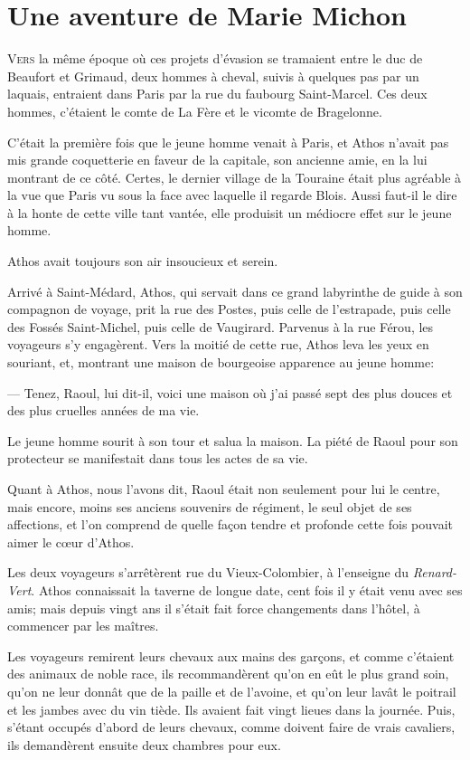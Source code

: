 \chapter{Une aventure de Marie Michon}

\lettrine{V}{ers} la même époque où ces projets d'évasion se tramaient entre le duc de Beaufort et Grimaud, deux hommes à cheval, suivis à quelques pas par un laquais, entraient dans Paris par la rue du faubourg Saint-Marcel. Ces deux hommes, c'étaient le comte de La Fère et le vicomte de Bragelonne.

C'était la première fois que le jeune homme venait à Paris, et Athos n'avait pas mis grande coquetterie en faveur de la capitale, son ancienne amie, en la lui montrant de ce côté. Certes, le dernier village de la Touraine était plus agréable à la vue que Paris vu sous la face avec laquelle il regarde Blois. Aussi faut-il le dire à la honte de cette ville tant vantée, elle produisit un médiocre effet sur le jeune homme.

Athos avait toujours son air insoucieux et serein.

Arrivé à Saint-Médard, Athos, qui servait dans ce grand labyrinthe de guide à son compagnon de voyage, prit la rue des Postes, puis celle de l'estrapade, puis celle des Fossés Saint-Michel, puis celle de Vaugirard. Parvenus à la rue Férou, les voyageurs s'y engagèrent. Vers la moitié de cette rue, Athos leva les yeux en souriant, et, montrant une maison de bourgeoise apparence au jeune homme:

— Tenez, Raoul, lui dit-il, voici une maison où j'ai passé sept des plus douces et des plus cruelles années de ma vie.

Le jeune homme sourit à son tour et salua la maison. La piété de Raoul pour son protecteur se manifestait dans tous les actes de sa vie.

Quant à Athos, nous l'avons dit, Raoul était non seulement pour lui le centre, mais encore, moins ses anciens souvenirs de régiment, le seul objet de ses affections, et l'on comprend de quelle façon tendre et profonde cette fois pouvait aimer le cœur d'Athos.

Les deux voyageurs s'arrêtèrent rue du Vieux-Colombier, à l'enseigne du \textit{Renard-Vert}. Athos connaissait la taverne de longue date, cent fois il y était venu avec ses amis; mais depuis vingt ans il s'était fait force changements dans l'hôtel, à commencer par les maîtres.

Les voyageurs remirent leurs chevaux aux mains des garçons, et comme c'étaient des animaux de noble race, ils recommandèrent qu'on en eût le plus grand soin, qu'on ne leur donnât que de la paille et de l'avoine, et qu'on leur lavât le poitrail et les jambes avec du vin tiède. Ils avaient fait vingt lieues dans la journée. Puis, s'étant occupés d'abord de leurs chevaux, comme doivent faire de vrais cavaliers, ils demandèrent ensuite deux chambres pour eux.

